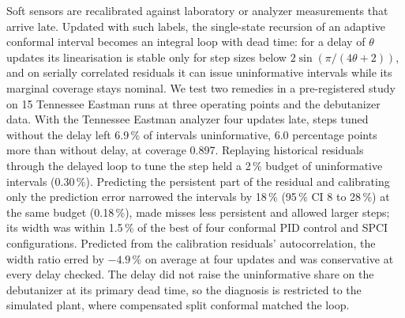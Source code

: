 Soft sensors are recalibrated against laboratory or analyzer measurements that arrive late.
Updated with such labels, the single-state recursion of an adaptive conformal interval becomes an
integral loop with dead time: for a delay of $\theta$ updates its linearisation is stable only for
step sizes below $2\sin(\pi/(4\theta+2))$, and on serially correlated residuals it can issue
uninformative intervals while its marginal coverage stays nominal. We test two remedies in a
pre-registered study on 15 Tennessee Eastman runs at three operating points and the debutanizer
data. With the Tennessee Eastman analyzer four updates late, steps tuned without the delay left
6.9\,\% of intervals uninformative, 6.0 percentage points more than without delay, at coverage
0.897. Replaying historical residuals through the delayed loop to tune the step held a 2\,\% budget of uninformative intervals (0.30\,\%). Predicting the persistent
part of the residual and calibrating only the prediction error narrowed the intervals by
18\,\% (95\,\% CI 8 to 28\,\%) at the same budget (0.18\,\%), made misses less persistent and
allowed larger steps; its width was within 1.5\,\% of the best of four conformal PID control
and SPCI configurations. Predicted from the calibration residuals' autocorrelation, the
width ratio erred by $-4.9$\,\% on average at four updates and was conservative at every delay
checked. The delay did not raise the uninformative share on the debutanizer at its primary dead
time, so the diagnosis is restricted to the simulated plant, where compensated split conformal
matched the loop.
